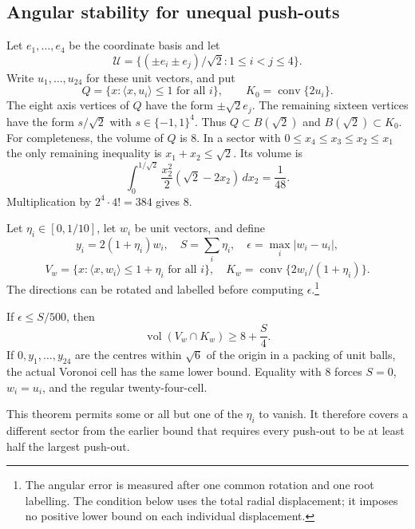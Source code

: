 \subsection{Angular stability for unequal push-outs}
\label{round26:sec:root-angular}

Let $e_1,\ldots,e_4$ be the coordinate basis and let
\[
 \mathcal U=\{(\pm e_i\pm e_j)/\sqrt2:1\le i<j\le4\}.
\]
Write $u_1,\ldots,u_{24}$ for these unit vectors, and put
\[
 Q=\{x:\langle x,u_i\rangle\le1\text{ for all }i\},
 \qquad K_0=\operatorname{conv}\{2u_i\}.
\]
The eight axis vertices of $Q$ have the form $\pm\sqrt2e_j$.
The remaining sixteen vertices have the form $s/\sqrt2$ with $s\in\{-1,1\}^4$. Thus
$Q\subset B(\sqrt2)$ and $B(\sqrt2)\subset K_0$.
For completeness, the volume of $Q$ is $8$. In a sector with
$0\le x_4\le x_3\le x_2\le x_1$ the only remaining inequality
is $x_1+x_2\le\sqrt2$. Its volume is
\[
 \int_0^{1/\sqrt2}\frac{x_2^2}{2}(\sqrt2-2x_2)\,dx_2
 =\frac1{48}.
\]
Multiplication by $2^4\cdot4!=384$ gives $8$.

Let $\eta_i\in[0,1/10]$, let $w_i$ be unit vectors, and define
\[
 y_i=2(1+\eta_i)w_i,\quad
 S=\sum_i\eta_i,\quad \epsilon=\max_i|w_i-u_i|,
\]
\[
 V_w=\{x:\langle x,w_i\rangle\le1+\eta_i\text{ for all }i\},
 \quad K_w=\operatorname{conv}\{2w_i/(1+\eta_i)\}.
\]
The directions can be rotated and labelled before computing $\epsilon$.\footnote{The angular error is measured after one common rotation and one root labelling. The condition below uses the total radial displacement; it imposes no positive lower bound on each individual displacement.}

\begin{thm}\label{round26:thm:unequal-angular}
If $\epsilon\le S/500$, then
\[
 \operatorname{vol}(V_w\cap K_w)\ge8+\frac S4.
\]
If $0,y_1,\ldots,y_{24}$ are the centres within $\sqrt6$ of the
origin in a packing of unit balls, the actual Voronoi cell has the
same lower bound. Equality with $8$ forces $S=0$, $w_i=u_i$, and
the regular twenty-four-cell.
\end{thm}

This theorem permits some or all but one of the $\eta_i$ to vanish.
It therefore covers a different sector from the earlier bound that
requires every push-out to be at least half the largest push-out.

